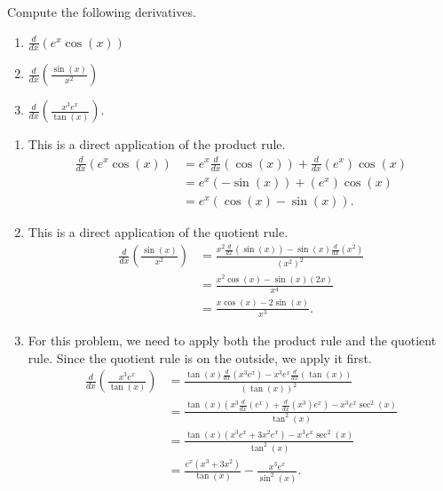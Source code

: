 \documentclass{ximera}
\begin{document}
\begin{example}
    Compute the following derivatives.
    \begin{enumerate}
        \item $\frac{d}{dx}\left(e^x \cos(x) \right)$
        \item $\frac{d}{dx}\left(\frac{\sin(x)}{x^2}\right)$
        \item $\frac{d}{dx}\left(\frac{x^3e^x}{\tan(x)}\right)$.
    \end{enumerate}
\end{example}

\begin{exampleSol}
    \begin{enumerate}
        \item This is a direct application of the product rule.
            \[ 
                \begin{split}
                    \frac{d}{dx}\left( e^x \cos(x) \right) &= e^x \frac{d}{dx}\left(\cos(x)\right) + \frac{d}{dx}\left(e^x \right)\cos(x) \\
                    &= e^x (-\sin(x)) + (e^x) \cos(x) \\
                    &= e^x(\cos(x) - \sin(x)).
                \end{split} 
            \]
        \item This is a direct application of the quotient rule.
            \[ 
                \begin{split}
                    \frac{d}{dx}\left(\frac{\sin(x)}{x^2}\right) &= \frac{x^2 \frac{d}{dx}\left(\sin(x)\right) - \sin(x) \frac{d}{dx}\left(x^2\right)}{(x^2)^2} \\
                    &= \frac{x^2 \cos(x) - \sin(x)(2x)}{x^4} \\
                    &= \frac{x\cos(x) - 2\sin(x)}{x^3}.
                \end{split} 
            \]
        \item For this problem, we need to apply both the product rule and the quotient rule. Since the quotient rule is on the outside, we apply it first.
            \[ 
                \begin{split}
                    \frac{d}{dx}\left(\frac{x^3e^x}{\tan(x)}\right) &= \frac{\tan(x) \frac{d}{dx}\left(x^3e^x\right) - x^3e^x \frac{d}{dx}\left(\tan(x)\right)}{(\tan(x))^2} \\
                    &= \frac{\tan(x)\left(x^3 \frac{d}{dx}\left(e^x\right) + \frac{d}{dx}\left(x^3\right)e^x\right) - x^3e^x\sec^2(x)}{\tan^2(x)} \\
                    &= \frac{\tan(x) \left(x^3e^x + 3x^2e^x\right) - x^3e^x\sec^2(x)}{\tan^2(x)} \\
                    &= \frac{e^x(x^3 + 3x^2)}{\tan(x)} - \frac{x^3e^x}{\sin^2(x)}.
                \end{split} 
            \]
    \end{enumerate}
\end{exampleSol}
\end{document}
